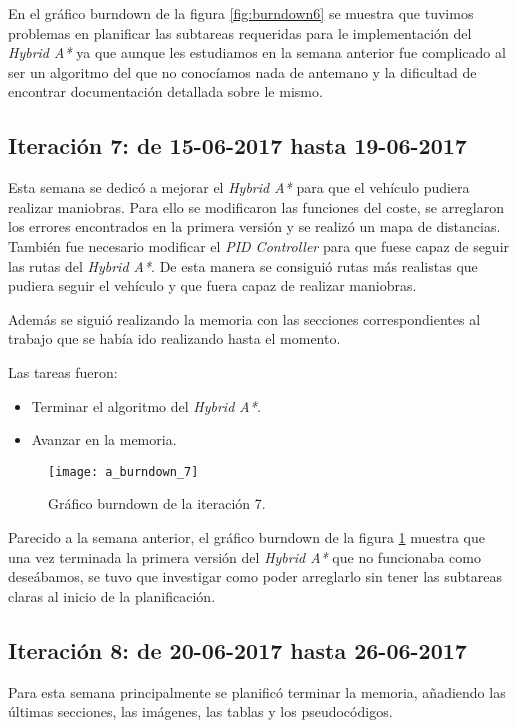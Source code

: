 En el gráfico burndown de la figura \ref{fig:burndown6} se muestra que tuvimos problemas en planificar las subtareas requeridas para le implementación del \textit{Hybrid A*} ya que aunque les estudiamos en la semana anterior fue complicado al ser un algoritmo del que no conocíamos nada de antemano y la dificultad de encontrar documentación detallada sobre le mismo.

\newpage
\subsection{Iteración 7: de 15-06-2017 hasta 19-06-2017}
Esta semana se dedicó a mejorar el \textit{Hybrid A*} para que el vehículo pudiera realizar maniobras. Para ello se modificaron las funciones del coste, se arreglaron los errores encontrados en la primera versión y se realizó un mapa de distancias. También fue necesario modificar el \textit{PID Controller} para que fuese capaz de seguir las rutas del \textit{Hybrid A*}. De esta manera se consiguió rutas más realistas que pudiera seguir el vehículo y que fuera capaz de realizar maniobras.

Además se siguió realizando la memoria con las secciones correspondientes al trabajo que se había ido realizando hasta el momento.

Las tareas fueron:
\begin{itemize}
\item Terminar el algoritmo del \textit{Hybrid A*}.
\item Avanzar en la memoria.
\end{itemize}

\begin{figure}[htpb]
    \centering
    \texttt{[image: a\_burndown\_7]}
    \caption[Gráfico burndown de la iteración 7]{Gráfico burndown de la iteración 7.}
    \label{fig:burndown7}
\end{figure}

Parecido a la semana anterior, el gráfico burndown de la figura \ref{fig:burndown7} muestra que una vez terminada la primera versión del \textit{Hybrid A*} que no funcionaba como deseábamos, se tuvo que investigar como poder arreglarlo sin tener las subtareas claras al inicio de la planificación.

\newpage
\subsection{Iteración 8: de 20-06-2017 hasta 26-06-2017}
Para esta semana principalmente se planificó terminar la memoria, añadiendo las últimas secciones, las imágenes, las tablas y los pseudocódigos.

